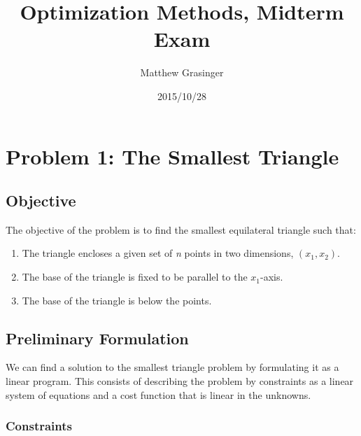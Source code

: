 \documentclass{article}
\title{Optimization Methods, Midterm Exam}
\date{2015/10/28}
\author{Matthew Grasinger}
\begin{document}
	
	
\maketitle
\newpage
{}
\tableofcontents
\newpage

\section{Problem 1: The Smallest Triangle} \label{sec:small_triangle}

\subsection{Objective}

The objective of the problem is to find the smallest equilateral triangle such that: 
\begin{enumerate}
	\item \label{enum:enclose} The triangle encloses a given set of \textit{n} points in two dimensions, $(x_1, x_2)$.
	\item \label{enum:base_parallel} The base of the triangle is fixed to be parallel to the $x_1$-axis.
	\item \label{enum:base_below} The base of the triangle is below the points.
\end{enumerate}

\subsection{Preliminary Formulation}

We can find a solution to the smallest triangle problem by formulating it as a linear program.
This consists of describing the problem by constraints as a linear system of equations and a cost function that is linear in the unknowns.

\subsubsection{Constraints}
\end{document}

